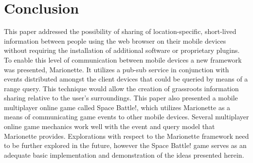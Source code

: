 \documentclass[12pt]{report}	%
\theoremstyle{definition}
\theoremstyle{remark}
\begin{document}
\chapter{Conclusion}

This paper addressed the possibility of sharing of location-specific,
short-lived information between people using the web browser on their
mobile devices without requiring the installation of additional software
or proprietary plugins. To enable this level of communication between
mobile devices a new framework was presented, Marionette. It utilizes a
pub-sub service in conjunction with events distributed amongst the
client devices that could be queried by means of a range query. This
technique would allow the creation of grassroots information sharing
relative to the user's surroundings. This paper also presented a mobile
multiplayer online game called Space Battle!, which utilizes Marionette
as a means of communicating game events to other mobile devices. Several
multiplayer online game mechanics work well with the event and query
model that Marionette provides. Explorations with respect to the
Marionette framework need to be further explored in the future, however
the Space Battle! game serves as an adequate basic implementation and
demonstration of the ideas presented herein.

%
%

%

%

%


\nocite{*}      %
\end{document}
